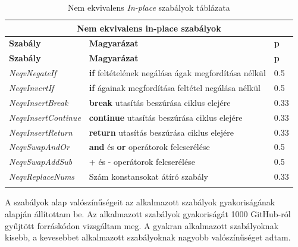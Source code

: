 \begin{center}
	\begin{longtable}{ | p{} | p{} | p{} | }
		\hline
		\multicolumn{3}{|c|}{\textbf{Nem ekvivalens in-place szabályok}}
		\\ \hline
		
		\textbf{Szabály} & \textbf{Magyarázat} & \textbf{p}
		\\ \hline \hline
		\endfirsthead %
		
		\hline
		\textbf{Szabály} & \textbf{Magyarázat} & \textbf{p}
		\\ \hline \hline
		\endhead %
		
		\hline
		\endfoot %
		
		\endlastfoot %
		
		\emph{NeqvNegateIf}
		& \textbf{if} feltételének negálása ágak megfordítása nélkül
		& 0.5
		\\ \hline

		\emph{NeqvInvertIf}
		& \textbf{if} ágainak megfordítása feltétel negálása nélkül
		& 0.5
		\\ \hline

		\emph{NeqvInsertBreak}
		& \textbf{break} utasítás beszúrása ciklus elejére
		& 0.33
		\\ \hline

		\emph{NeqvInsertContinue}
		& \textbf{continue} utasítás beszúrása ciklus elejére
		& 0.33
		\\ \hline

		\emph{NeqvInsertReturn}
		& \textbf{return} utasítás beszúrása ciklus elejére
		& 0.33
		\\ \hline
		
		\emph{NeqvSwapAndOr}
		& \textbf{and} és \textbf{or} operátorok felcserélése
		& 0.5
		\\ \hline

		\emph{NeqvSwapAddSub}
		& + és - operátorok felcserélése
		& 0.5
		\\ \hline

		\emph{NeqvReplaceNums}
		& Szám konstansokat átíró szabály
		& 0.33
		\\ \hline

		\caption{Nem ekvivalens \emph{In-place} szabályok táblázata}
		\label{tab:in-place-rules-neqv}
	\end{longtable}
\end{center}

A szabályok alap valószínűségeit az alkalmazott szabályok gyakoriságának alapján állítottam be.
Az alkalmazott szabályok gyakoriságát 1000 GitHub-ról gyűjtött forráskódon vizsgáltam meg.
A gyakran alkalmazott szabályoknak kisebb, a kevesebbet alkalmazott szabályoknak nagyobb valószínűséget adtam.

